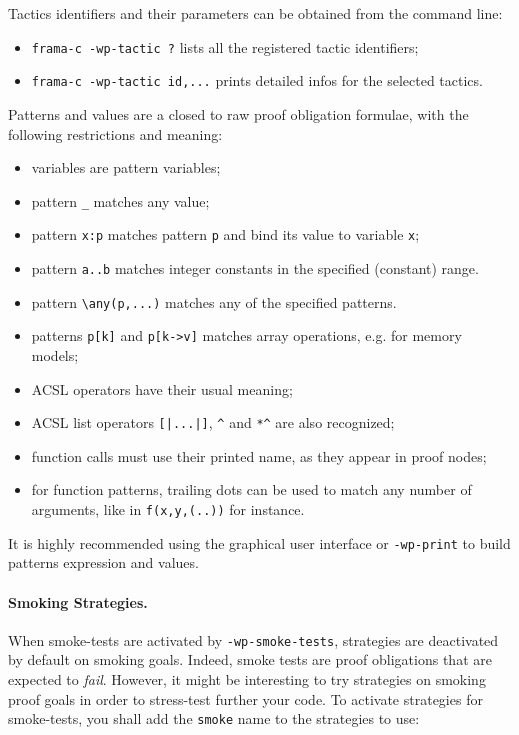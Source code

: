 Tactics identifiers and their parameters can be obtained from the command line:
\begin{itemize}
\item \verb|frama-c -wp-tactic ?| lists all the registered tactic identifiers;
\item \verb|frama-c -wp-tactic id,...| prints detailed infos for the selected tactics.
\end{itemize}

Patterns and values are a closed to raw proof obligation formulae, with the
following restrictions and meaning:
\begin{itemize}
\item variables are pattern variables;
\item pattern \verb+_+ matches any value;
\item pattern \verb+x:p+ matches pattern \verb+p+ and bind its value to variable \verb+x+;
\item pattern \verb+a..b+ matches integer constants in the specified (constant) range.
\item pattern \verb+\any(p,...)+ matches any of the specified patterns.
\item patterns \verb+p[k]+ and \verb+p[k->v]+ matches array operations, e.g. for memory models;
\item ACSL operators have their usual meaning;
\item ACSL list operators \verb+[|...|]+, \verb+^+ and \verb+*^+ are also recognized;
\item function calls must use their printed name, as they appear in proof nodes;
\item for function patterns, trailing dots can be used to match any number of
  arguments, like in \verb+f(x,y,(..))+ for instance.
\end{itemize}

It is highly recommended using the graphical user interface or \verb+-wp-print+
to build patterns expression and values.

\paragraph{Smoking Strategies.} When smoke-tests are activated by \verb+-wp-smoke-tests+,
strategies are deactivated by default on smoking goals. Indeed, smoke tests are
proof obligations that are expected to \emph{fail}. However, it might be
interesting to try strategies on smoking proof goals in order to stress-test
further your code. To activate strategies for smoke-tests, you shall add the \verb'smoke'
name to the strategies to use:

